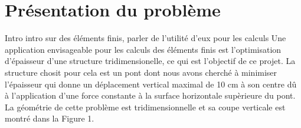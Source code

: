 \documentclass{article}
\begin{document}


    \section{Présentation du problème}
    Intro intro sur des éléments finis, parler de l'utilité d'eux pour les calculs    
    Une application envisageable pour les calculs des éléments finis est l'optimisation d'épaisseur d'une structure tridimensionelle, ce qui est l'objectif de ce projet. La structure chosit pour cela est un pont dont nous avons cherché à minimiser l'épaisseur qui donne un déplacement vertical maximal de 10 cm à son centre dû à l'application d'une force constante à la surface horizontale supèrieure du pont. La géométrie de cette problème est tridimensionnelle et sa coupe verticale est montré dans la Figure 1. %
\end{document}

